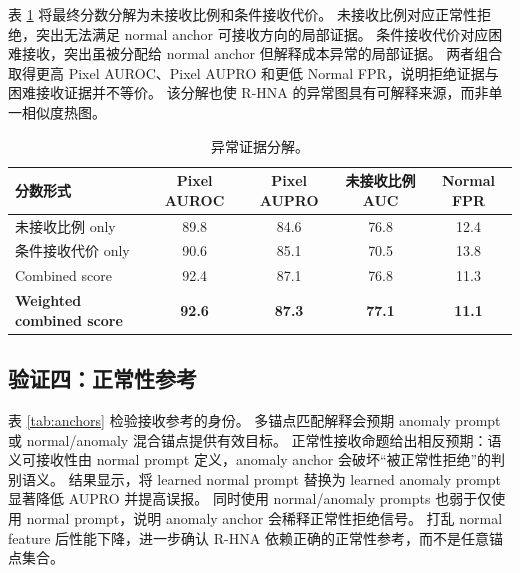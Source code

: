 \documentclass[UTF8,fontset=none,10pt]{ctexart}
\newcommand{\method}{R-HNA}
\begin{document}
表 \ref{tab:score} 将最终分数分解为未接收比例和条件接收代价。
未接收比例对应正常性拒绝，突出无法满足 normal anchor 可接收方向的局部证据。
条件接收代价对应困难接收，突出虽被分配给 normal anchor 但解释成本异常的局部证据。
两者组合取得更高 Pixel AUROC、Pixel AUPRO 和更低 Normal FPR，说明拒绝证据与困难接收证据并不等价。
该分解也使 \method{} 的异常图具有可解释来源，而非单一相似度热图。

\begin{table}[t]
\centering
\caption{异常证据分解。}
\label{tab:score}
\begin{tabular}{lcccc}
\toprule
分数形式 & Pixel AUROC & Pixel AUPRO & 未接收比例 AUC & Normal FPR \\
\midrule
未接收比例 only & 89.8 & 84.6 & 76.8 & 12.4 \\
条件接收代价 only & 90.6 & 85.1 & 70.5 & 13.8 \\
Combined score & 92.4 & 87.1 & 76.8 & 11.3 \\
\textbf{Weighted combined score} & \textbf{92.6} & \textbf{87.3} & \textbf{77.1} & \textbf{11.1} \\
\bottomrule
\end{tabular}
\end{table}

\subsection{验证四：正常性参考}

表 \ref{tab:anchors} 检验接收参考的身份。
多锚点匹配解释会预期 anomaly prompt 或 normal/anomaly 混合锚点提供有效目标。
正常性接收命题给出相反预期：语义可接收性由 normal prompt 定义，anomaly anchor 会破坏“被正常性拒绝”的判别语义。
结果显示，将 learned normal prompt 替换为 learned anomaly prompt 显著降低 AUPRO 并提高误报。
同时使用 normal/anomaly prompts 也弱于仅使用 normal prompt，说明 anomaly anchor 会稀释正常性拒绝信号。
打乱 normal feature 后性能下降，进一步确认 \method{} 依赖正确的正常性参考，而不是任意锚点集合。

\begin{table}[t]
\centering
\caption{Learned prompt 锚点分析。所有设置保持相同 UOT 参数和后处理。}
\label{tab:anchors}
\end{table}
\end{document}
